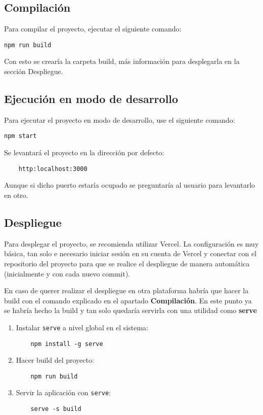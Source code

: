 \subsection{Compilación}
Para compilar el proyecto, ejecutar el siguiente comando:
\begin{verbatim}
npm run build
\end{verbatim}
Con esto se crearía la carpeta build, más información para desplegarla en la sección Despliegue.

\subsection{Ejecución en modo de desarrollo}
Para ejecutar el proyecto en modo de desarrollo, use el siguiente comando:
\begin{verbatim}
npm start
\end{verbatim}
Se levantará el proyecto en la dirección por defecto:
\begin{verbatim}
    http:localhost:3000
\end{verbatim}
Aunque si dicho puerto estaría ocupado se preguntaría al usuario para levantarlo en otro.

\subsection{Despliegue}
Para desplegar el proyecto, se recomienda utilizar Vercel. La configuración es muy básica, tan solo e necesario iniciar sesión en su cuenta de Vercel y conectar con el repositorio del proyecto para que se realice el despliegue de manera automática (inicialmente y con cada nuevo commit).

En caso de querer realizar el despliegue en otra plataforma habría que hacer la build con el comando explicado en el apartado \textbf{Compilación}.
En este punto ya se habría hecho la build y tan solo quedaría servirla con una utilidad como \textbf{serve} \cite{npm:serve}

\begin{enumerate}
    \item Instalar \texttt{serve} a nivel global en el sistema:
    \begin{verbatim}
    npm install -g serve
    \end{verbatim}
    \item Hacer build del proyecto:
    \begin{verbatim}
    npm run build
    \end{verbatim}
    \item Servir la aplicación con \texttt{serve}:
    \begin{verbatim}
    serve -s build
    \end{verbatim}
\end{enumerate}

